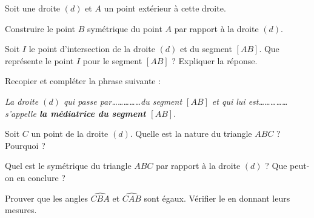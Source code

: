 Soit une droite $(d)$ et $A$ un point extérieur à cette droite.
\begin{myenumerate}
\item Construire le point $B$ symétrique du point $A$ par rapport à la
droite $(d)$.
\item Soit $I$ le point d'intersection de la droite $(d)$ et du
segment $[AB]$. Que représente le point $I$ pour le segment $[AB]$ ?
Expliquer la réponse.
\par Recopier et compléter la phrase suivante :
\par{\em La droite $(d)$ qui passe par\dots\dots\dots\dots\dots du
segment $[AB]$ et qui lui est\dots\dots\dots\dots\dots s'appelle {\bf
la médiatrice du segment $[AB]$}}.
\item Soit $C$ un point de la droite $(d)$. Quelle est la nature du
triangle $ABC$ ? Pourquoi ?
\item Quel est le symétrique du triangle $ABC$ par rapport à la droite
$(d)$ ? Que peut-on en conclure ?
\item Prouver que les angles $\widehat{CBA}$ et $\widehat{CAB}$ sont
égaux. Vérifier le en donnant leurs mesures.
\end{myenumerate}
